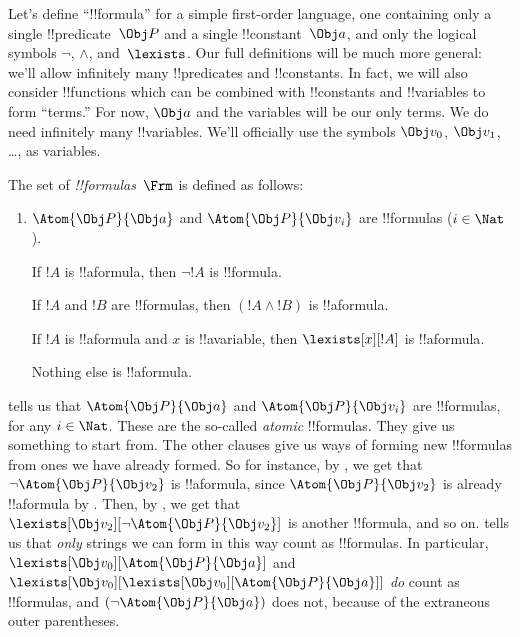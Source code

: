 Let's define ``!!{formula}'' for a simple first-order language, one
containing only a single !!{predicate}~$\Obj P$ and a single
!!{constant}~$\Obj a$, and only the logical symbols $\lnot$, $\land$,
and~$\lexists$. Our full definitions will be much more general:
we'll allow infinitely many !!{predicate}s and !!{constant}s. In fact,
we will also consider !!{function}s which can be combined with
!!{constant}s and !!{variable}s to form ``terms.'' For now, $\Obj a$
and the variables will be our only terms.  We do need infinitely many
!!{variable}s.  We'll officially use the symbols $\Obj v_0$, $\Obj
v_1$, \dots, as variables.

\begin{defn}
The set of \emph{!!{formula}s}~$\Frm$ is defined as follows:
\begin{enumerate}
\item{} $\Atom{\Obj P}{\Obj a}$ and $\Atom{\Obj
  P}{\Obj v_i}$ are !!{formula}s ($i \in \Nat$).

If $!A$ is !!a{formula}, then $\lnot !A$ is
  !!{formula}.

If $!A$ and $!B$ are !!{formula}s, then $(!A \land
  !B)$ is !!a{formula}.

If $!A$ is !!a{formula} and $x$ is !!a{variable},
  then $\lexists[x][!A]$ is !!a{formula}.

Nothing else is !!a{formula}.
\end{enumerate}
\end{defn}

 tells us that $\Atom{\Obj P}{\Obj a}$ and
$\Atom{\Obj P}{\Obj v_i}$ are !!{formula}s, for any $i \in
\Nat$. These are the so-called \emph{atomic} !!{formula}s. They give
us something to start from.  The other clauses give us ways of forming
new !!{formula}s from ones we have already formed. So for instance, by
, we get that $\lnot \Atom{\Obj P}{\Obj v_2}$ is
!!a{formula}, since $\Atom{\Obj P}{\Obj v_2}$ is already !!a{formula}
by . Then, by , we get that
$\lexists[\Obj v_2][\lnot \Atom{\Obj P}{\Obj v_2}]$ is another
!!{formula}, and so on.   tells us that \emph{only}
strings we can form in this way count as !!{formula}s. In particular,
$\lexists[\Obj v_0][\Atom{\Obj P}{\Obj a}]$ and $\lexists[\Obj
  v_0][\lexists[\Obj v_0][\Atom{\Obj P}{\Obj a}]]$ \emph{do} count as
!!{formula}s, and $(\lnot \Atom{\Obj P}{\Obj a})$ does not, because of
the extraneous outer parentheses.

